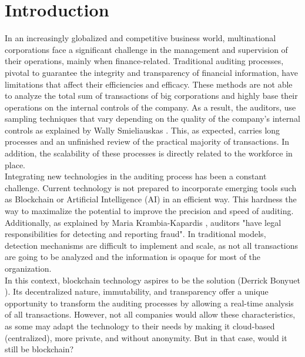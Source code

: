 \chapter{Introduction}
\label{ch:intro}

In an increasingly globalized and competitive business world, multinational corporations face a significant challenge in the management and supervision of their operations, mainly when finance-related. Traditional auditing processes, pivotal to guarantee the integrity and transparency of financial information, have limitations that affect their efficiencies and efficacy. These methods are not able to analyze the total sum of transactions of big corporations and highly base their operations on the internal controls of the company. As a result, the auditors, use sampling techniques that vary depending on the quality of the company's internal controls as explained by Wally Smieliauskas \cite{sampling}. This, as expected, carries long processes and an unfinished review of the practical majority of transactions. In addition, the scalability of these processes is directly related to the workforce in place. \\

Integrating new technologies in the auditing process has been a constant challenge. Current technology is not prepared to incorporate emerging tools such as Blockchain or Artificial Intelligence (AI) in an efficient way. This hardness the way to maximalize the potential to improve the precision and speed of auditing. Additionally, as explained by Maria Krambia-Kapardis \cite{fraudAuditing}, auditors "have legal responsibilities for detecting and reporting fraud". In traditional models, detection mechanisms are difficult to implement and scale, as not all transactions are going to be analyzed and the information is opaque for most of the organization. \\ 

In this context, blockchain technology aspires to be the solution (Derrick Bonyuet \cite{blockchainCharacteristics}). Its decentralized nature, immutability, and transparency offer a unique opportunity to transform the auditing processes by allowing a real-time analysis of all transactions. However, not all companies would allow these characteristics, as some may adapt the technology to their needs by making it cloud-based (centralized), more private, and without anonymity. But in that case, would it still be blockchain? \\

